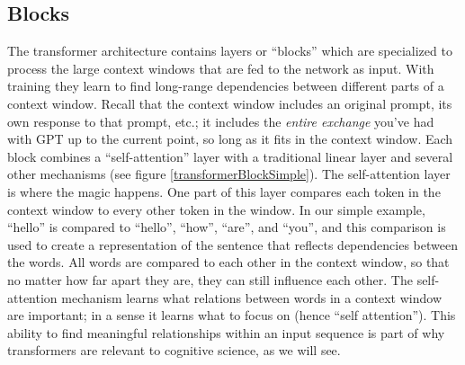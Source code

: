 \subsection{Blocks}

The transformer architecture \cite{vaswani2017attention} contains layers or ``blocks'' which are specialized to process the large context windows that are fed to the network as input. With training they learn to find long-range dependencies between different parts of a context window. Recall that the context window  includes an original prompt, its own response to that prompt, etc.; it includes the \emph{entire exchange} you've had with GPT up to the current point, so long as it fits in the context window. Each block combines  a ``self-attention'' layer with a traditional linear layer and several other mechanisms (see figure \ref{transformerBlockSimple}). The self-attention layer is where the magic happens. One part of this layer compares each token in the context window to every other token in the window. In our simple example, ``hello'' is compared to ``hello'', ``how'', ``are'', and ``you'', and this comparison is used to create a representation of the sentence that reflects dependencies between the words. All words are compared to each other in the context window, so that no matter how far apart they are, they can still influence each other. The self-attention mechanism learns what relations between words in a context window are important; in a sense it learns what to focus on (hence ``self attention''). This ability to find meaningful relationships within an input sequence is part of why transformers are relevant to cognitive science, as we will see.

